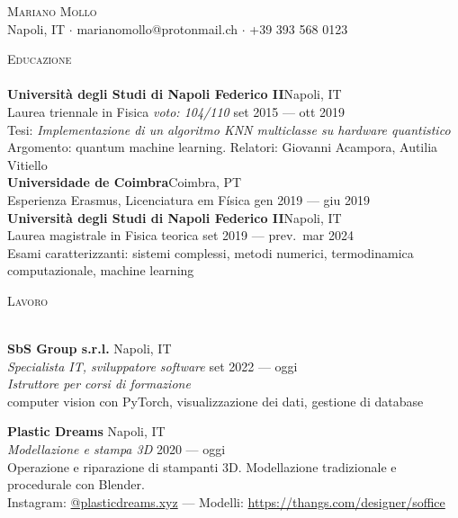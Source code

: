 \documentclass[a4paper]{article}
\newcommand{\lineunder} {
  \vspace*{-8pt} \\
  \hspace*{-18pt} \hrulefill \\
}
\newcommand{\header} [1] {
  {\hspace*{-18pt}\vspace*{6pt} \textsc{#1}}
  \vspace*{-6pt} \lineunder
}
\begin{document}
\vspace*{-40pt}

    

\vspace*{-10pt}
\begin{center}
  {\Huge \scshape {Mariano Mollo}}\\
  Napoli, IT $\cdot$ marianomollo@protonmail.ch $\cdot$ +39 393 568 0123\\
\end{center}

\header{Educazione}
\textbf{Università degli Studi di Napoli Federico II}\hfill Napoli, IT\\
Laurea triennale in Fisica \textit{voto: 104/110} \hfill set 2015 --- ott 2019\\
Tesi: \textit{Implementazione di un algoritmo KNN multiclasse su hardware quantistico}\\
Argomento: quantum machine learning.
Relatori: Giovanni Acampora, Autilia Vitiello\\
\vspace{2mm}
\textbf{Universidade de Coimbra}\hfill Coimbra, PT\\
Esperienza Erasmus, Licenciatura em Física \hfill gen 2019 --- giu 2019\\
\vspace{2mm}
\textbf{Università degli Studi di Napoli Federico II}\hfill Napoli, IT \\
Laurea magistrale in Fisica teorica \hfill set 2019 --- prev.\ mar 2024 \\
Esami caratterizzanti: sistemi complessi, metodi numerici, termodinamica computazionale, machine learning
\vspace{2mm}

\header{Lavoro}
\vspace{1mm}

\textbf{SbS Group s.r.l.} \hfill Napoli, IT \\
\textit{Specialista IT, sviluppatore software} \hfill set 2022 --- oggi \\
\textit{Istruttore per corsi di formazione} \\
computer vision con PyTorch, visualizzazione dei dati, gestione di database
\vspace{5mm}

\textbf{Plastic Dreams} \hfill Napoli, IT \\
\textit{Modellazione e stampa 3D} \hfill 2020 --- oggi \\
Operazione e riparazione di stampanti 3D. Modellazione tradizionale e procedurale con Blender. \\
Instagram: \href{https://www.instagram.com/plasticdreams.xyz/}{@plasticdreams.xyz}
--- Modelli: \url{https://thangs.com/designer/soffice}
\vspace{5mm}
\end{document}
